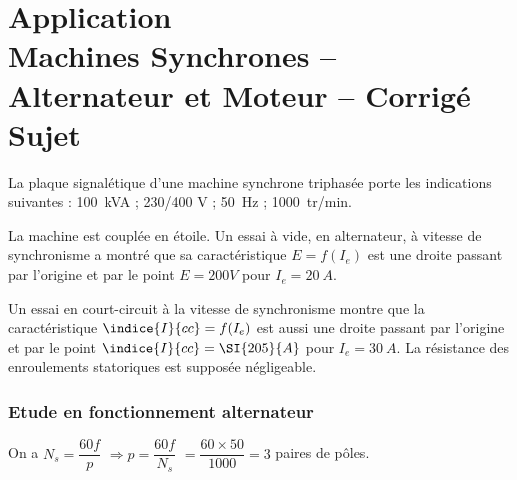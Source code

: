 \chapter*{Application  \\ 
Machines Synchrones -- Alternateur et Moteur
-- \ifprof Corrigé \else Sujet \fi}

\iflivret {} \else
\ifprof  {} \else \fi
\fi

\setcounter{question}{0}

La plaque signalétique d’une machine synchrone triphasée porte les indications suivantes : 
\SI{100}{kVA} ; 230/400 \si{V} ; \SI{50}{Hz} ; \SI{1000}{tr/min}. 

La machine est couplée en étoile.
Un essai à vide, en alternateur, à vitesse de synchronisme a montré que sa caractéristique $E=f(I_e)$   est une droite passant par l’origine et par le point $E = 200 V$ pour $I_e = \SI{20}{A}$.

Un essai en court-circuit à la vitesse de synchronisme montre que la caractéristique $\indice{I}{cc}=f(I_e)$ est aussi une droite passant par l’origine et par le point $\indice{I}{cc} = \SI{205}{A}$ pour $I_e = \SI{30}{A}$.
La résistance des enroulements statoriques est supposée négligeable. 

\subsection*{Etude en fonctionnement alternateur}

\ifprof
\begin{corrige}
On a $N_s = \dfrac{60f}{p}$ $\Rightarrow p = \dfrac{60f}{N_s}$ $=\dfrac{60\times 50}{1000}=3$ paires de pôles.

\end{corrige}
\else
\fi



